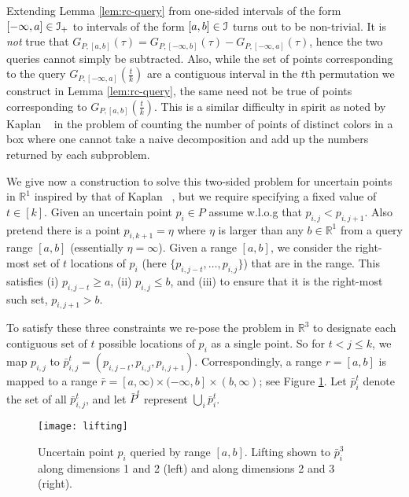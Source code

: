 \documentclass[11pt]{myclass}
\newcommand{\Eu}[1]{\ensuremath{\EuScript{#1}}}
\newcommand{\bl}[1]{\ensuremath{\mathbb{#1}}}
\begin{document}
Extending Lemma \ref{lem:rc-query} from one-sided intervals of the form $[-\infty, a] \in \Eu{I}_+$ to intervals of the form $[a, b] \in \Eu{I}$ turns out to be non-trivial.  It is \emph{not} true that $G_{P,[a,b]}(\tau) = G_{P,[-\infty,b]}(\tau) - G_{P,[-\infty,a]}(\tau)$, hence the two queries cannot simply be subtracted.  Also, while the set of points corresponding to the
query $G_{P,[-\infty, a]}(\frac{t}{k})$ are a contiguous interval in the $t$th permutation we construct in Lemma \ref{lem:rc-query}, the same need not be true of points corresponding to $G_{P,[a,b]}(\frac{t}{k})$.
This is a similar difficulty in spirit as noted by Kaplan \etal~\cite{colors} in the problem of counting the number of points of distinct colors in a box where one cannot take a naive decomposition and add up the numbers returned by each subproblem. 

We give now a construction to solve this two-sided problem for uncertain points in $\bl{R}^1$ inspired by that of Kaplan \etal~\cite{colors}, but we require specifying a fixed value of $t \in [k]$.  Given an uncertain point $p_i \in P$ assume w.l.o.g that $p_{i,j} < p_{i,j+1}$.  Also pretend there is a point $p_{i,k+1} = \eta$ where $\eta$ is larger than any $b \in \bl{R}^1$ from a query range $[a,b]$ (essentially $\eta = \infty$).  
Given a range $[a,b]$, we consider the right-most set of $t$ locations of $p_i$ (here $\{p_{i,j-t}, \ldots, p_{i,j}\}$) that are in the range.  This satisfies 
(i) $p_{i,j - t} \geq a$, 
(ii) $p_{i,j} \leq b$, and 
(iii) to ensure that it is the right-most such set, $p_{i,j+1} > b$.  

To satisfy these three constraints we re-pose the problem in $\bl{R}^3$ to designate each contiguous set of $t$ possible locations of $p_i$ as a single point.  So for $t < j \leq k$, we map $p_{i,j}$ to $\bar{p}_{i,j}^t = (p_{i,j-t}, p_{i,j}, p_{i,j+1})$.  
Correspondingly, a range $r = [a,b]$ is mapped to a range $\bar{r} = [a, \infty) \times (-\infty,b] \times (b,\infty)$;  
see Figure \ref{fig:queryreduction}.
Let $\bar p_i^t$ denote the set of all $\bar p^t_{i,j}$, and let $\bar{P}^t$ represent $\bigcup_i \bar{p}_i^t$.  
 
\begin{figure}[t]
\centering
\texttt{[image: lifting]}
\vspace{-4mm}
\caption{\small Uncertain point $p_i$ queried by range $[a,b]$.  Lifting shown to $\bar{p}_i^3$ along dimensions 1 and 2 (left) and along dimensions 2 and 3 (right).
\vspace{-4mm}
}  

\label{fig:queryreduction}
\end{figure} 
 
\end{document}
